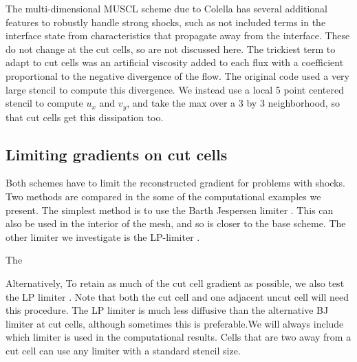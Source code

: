 The multi-dimensional MUSCL scheme due to Colella has several additional
features to robustly handle strong shocks, such as not included terms in the
interface state from characteristics that propagate away from the interface. These
do not change at the cut cells, so are not discussed here.  The
trickiest  term to adapt to cut cells was an artificial viscosity 
added to each flux with a
coefficient proportional to the negative divergence of the flow.  The original
code used a very large stencil to compute this divergence. We instead use a local 5
point centered stencil to compute $u_x$ and $v_y$, and take the max over a 3 by 3
neighborhood, so that cut cells get this dissipation too.

\subsection{Limiting gradients on cut cells}
Both schemes have to limit the reconstructed gradient for problems with shocks.
Two methods are compared in the some of the computational examples we present.
The simplest method is to use the Barth Jespersen limiter \cite{}. This can also be
used in the interior of the mesh, and so is closer to the base scheme. The other
limiter we investigate is the LP-limiter \cite{May_Berger_LP}.

The

Alternatively, To retain as much of the cut cell gradient as possible, we also test the LP limiter 
\cite{May_Berger_LP}. Note that both the cut cell and one adjacent uncut cell will
need this procedure.  The LP limiter is much less diffusive than the alternative 
BJ limiter at cut cells,
although sometimes this is preferable.We will always include which limiter is used
in the computational results.  Cells that are two away from a cut cell
can use any limiter with a standard stencil size. 

